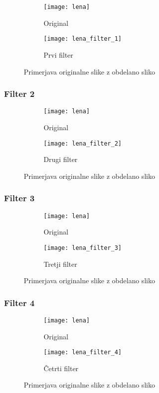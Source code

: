 \begin{figure}[h]
    \centering
    \begin{subfigure}[b]{0.4\textwidth}
        \texttt{[image: lena]}
        \caption{Original}
    \end{subfigure}
    \begin{subfigure}[b]{0.4\textwidth}
        \texttt{[image: lena\_filter\_1]}
        \caption{Prvi filter}
    \end{subfigure}
    \caption{Primerjava originalne slike z obdelano sliko}
    \label{fig:lena_filter_1}
\end{figure}


\subsubsection*{Filter 2}
\begin{figure}[h]
    \centering
    \begin{subfigure}[b]{0.4\textwidth}
        \texttt{[image: lena]}
        \caption{Original}
    \end{subfigure}
    \begin{subfigure}[b]{0.4\textwidth}
        \texttt{[image: lena\_filter\_2]}
        \caption{Drugi filter}
    \end{subfigure}
    \caption{Primerjava originalne slike z obdelano sliko}
    \label{fig:lena_filter_2}
\end{figure}


\subsubsection*{Filter 3}
\begin{figure}[h]
    \centering
    \begin{subfigure}[b]{0.4\textwidth}
        \texttt{[image: lena]}
        \caption{Original}
    \end{subfigure}
    \begin{subfigure}[b]{0.4\textwidth}
        \texttt{[image: lena\_filter\_3]}
        \caption{Tretji filter}
    \end{subfigure}
    \caption{Primerjava originalne slike z obdelano sliko}
    \label{fig:lena_filter_3}
\end{figure}


\subsubsection*{Filter 4}
\begin{figure}[h]
    \centering
    \begin{subfigure}[b]{0.4\textwidth}
        \texttt{[image: lena]}
        \caption{Original}
    \end{subfigure}
    \begin{subfigure}[b]{0.4\textwidth}
        \texttt{[image: lena\_filter\_4]}
        \caption{Četrti filter}
    \end{subfigure}
    \caption{Primerjava originalne slike z obdelano sliko}
    \label{fig:lena_filter_4}
\end{figure}


